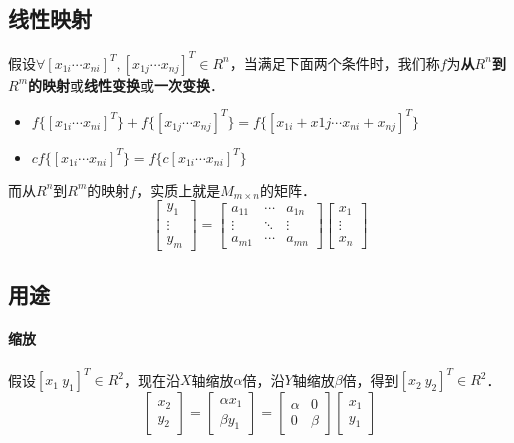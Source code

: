 \documentclass[12pt]{article}
\begin{document}
\begin{CJK}{UTF8}{gbsn}
\section{线性映射}
假设$\forall [x_{1i} \cdots x_{ni}]^T,[x_{1j} \cdots x_{nj}]^T \in R^n$，当满足下面两个条件时，我们称$f$为\textbf{从$R^n$到$R^m$的映射}或\textbf{线性变换}或\textbf{一次变换}．
\begin{itemize}
\item $f\lbrace[x_{1i} \cdots x_{ni}]^T\rbrace + f\lbrace[x_{1j} \cdots x_{nj}]^T\rbrace = f\lbrace[x_{1i}+x{1j} \cdots x_{ni}+x_{nj}]^T\rbrace$
\item $cf\lbrace[x_{1i} \cdots x_{ni}]^T\rbrace = f\lbrace c[x_{1i} \cdots x_{ni}]^T\rbrace$
\end{itemize}
而从$R^n$到$R^m$的映射$f$，实质上就是$M_{m \times n}$的矩阵．
\begin{equation}
\left[
\begin{array}{c}
y_{1}\\
\vdots\\
y_{m}
\end{array}
\right]
=
\left[
\begin{array}{ccc}
a_{11} & \cdots & a_{1n}\\
\vdots & \ddots & \vdots\\
a_{m1} & \cdots & a_{mn}
\end{array}
\right]
\left[
\begin{array}{c}
x_{1}\\
\vdots\\
x_{n}
\end{array}
\right]
\end{equation}
\subsection{用途}
\paragraph{缩放}
假设$[x_1\ y_1]^T \in R^2$，现在沿$X$轴缩放$\alpha$倍，沿$Y$轴缩放$\beta$倍，得到$[x_2\ y_2]^T \in R^2$．
\begin{equation}
\left[
\begin{array}{c}
x_2\\
y_2
\end{array}
\right]
=
\left[
\begin{array}{c}
\alpha x_1\\
\beta y_1
\end{array}
\right]
=
\left[
\begin{array}{cc}
\alpha & 0\\
0 & \beta
\end{array}
\right]
\left[
\begin{array}{c}
x_1\\
y_1
\end{array}
\right]
\end{equation}


\end{CJK}
\end{document}
